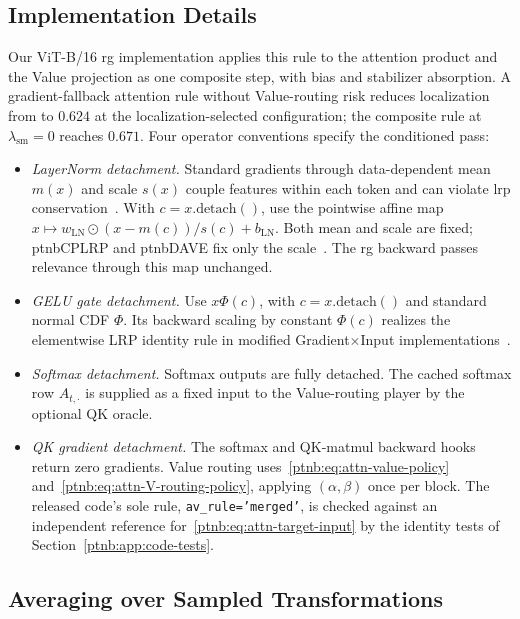 \subsection{Implementation Details}\label{ptnb:app:vit-implementation}\label{sec:vit_implementation}

Our ViT-B/16 \ac{rg} implementation applies this rule to the attention product and the Value projection as one composite step, with bias and stabilizer absorption. A gradient-fallback attention rule without Value-routing risk reduces localization from \vitRGlocAL{} to $0.624$ at the localization-selected configuration; the composite rule at $\lambda_{\mathrm{sm}}=0$ reaches $0.671$. Four operator conventions specify the conditioned pass:
\begin{itemize}
    \item \emph{LayerNorm detachment.}\label{ptnb:app:dave-conditioned} Standard gradients through data-dependent mean $m(x)$ and scale $s(x)$ couple features within each token and can violate \ac{lrp} conservation~\parencite{Ali2022AttnLRP}. With $c=x.\text{detach}()$, use the pointwise affine map $x\mapsto w_{\mathrm{LN}}\odot(x-m(c))/s(c)+b_{\mathrm{LN}}$. Both mean and scale are fixed; \ac{ptnbCPLRP} and \ac{ptnbDAVE} fix only the scale~\parencite{Wrobel2024}. The \ac{rg} backward passes relevance through this map unchanged.
    \item \emph{GELU gate detachment.} Use $x\Phi(c)$, with $c=x.\text{detach}()$ and standard normal CDF $\Phi$. Its backward scaling by constant $\Phi(c)$ realizes the elementwise LRP identity rule in modified Gradient$\times$Input implementations~\parencite[Appendix~D.3]{Arras2025CloseLook}.
    \item \emph{Softmax detachment.} Softmax outputs are fully detached. The cached softmax row $A_{t,\cdot}$ is supplied as a fixed input to the Value-routing player by the optional QK oracle.
    \item \emph{QK gradient detachment.}\label{ptnb:app:attention-grad-detach} The softmax and QK-matmul backward hooks return zero gradients. Value routing uses~\eqref{ptnb:eq:attn-value-policy} and~\eqref{ptnb:eq:attn-V-routing-policy}, applying $(\alpha,\beta)$ once per block. The released code's sole rule, \texttt{av\_rule='merged'}, is checked against an independent reference for~\eqref{ptnb:eq:attn-target-input} by the identity tests of Section~\ref{ptnb:app:code-tests}.
\end{itemize}

\subsection{Averaging over Sampled Transformations}\label{ptnb:app:equivariant}

